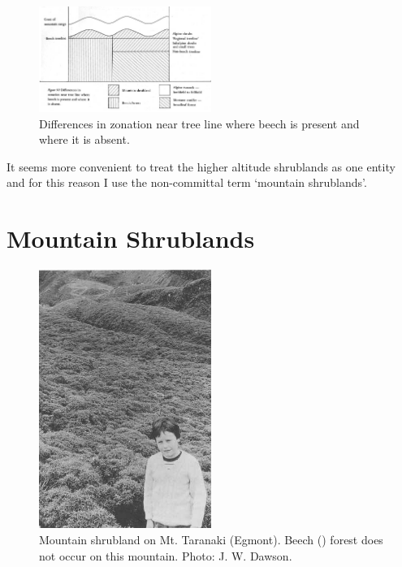 \begin{figure}
	\includegraphics[width=0.5\textwidth]{graphics/figure90zonation.jpg}
	\centering
	\caption[Differences in zonation]{Differences in zonation near tree line where beech is present and where it is absent.}%
	\label{fig:90zonation}
\end{figure}

It seems more convenient to treat the higher altitude shrublands as one entity and for this reason I use the non-committal term `mountain shrublands'.

\section{Mountain Shrublands}

\begin{figure}
	\includegraphics[width=0.5\textwidth]{graphics/figure91shrubland.jpg}
	\centering
	\caption[Mountain shrubland on Mt.
	Taranaki]{Mountain shrubland on Mt.
	Taranaki (Egmont).
	Beech () forest does not occur on this mountain.
	Photo: J. W. Dawson.}%
	\label{fig:91shrubland}
\end{figure}

